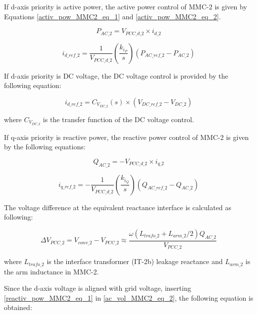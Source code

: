 If d-axis priority is active power, the active power control of \gls{MMC}-2 is given by Equations \ref{activ_pow_MMC2_eq_1} and \ref{activ_pow_MMC2_eq_2}.

\begin{equation}\label{activ_pow_MMC2_eq_1}
    P_{AC\_2} = V_{PCC\_d\_2} \times i_{d\_2}
\end{equation}

\begin{equation}\label{activ_pow_MMC2_eq_2}
    i_{d\_ref\_2} =  \frac{1}{V_{PCC\_d\_2}} \left(\frac{k_{i_P}}{s}\right)\left(P_{AC\_ref\_2}-P_{AC\_2}\right)
\end{equation}

If d-axis priority is \gls{DC} voltage, the \gls{DC} voltage control is provided by the following equation:

\begin{equation}
    i_{d\_ref\_2} = C_{V_{DC\_2}}\left(s\right) \times \left(V_{DC\_ref\_2} - V_{DC\_2}\right)
\end{equation}

where $C_{V_{DC\_2}}$ is the transfer function of the \gls{DC} voltage control.

If q-axis priority is reactive power, the reactive power control of \gls{MMC}-2 is given by the following equations:

\begin{equation}\label{reactiv_pow_MMC2_eq_1}
    Q_{AC\_2} = -V_{PCC\_d\_2} \times i_{q\_2}
\end{equation}

\begin{equation}\label{reactiv_pow_MMC2_eq_2}
    i_{q\_ref\_2} = -  \frac{1}{V_{PCC\_d\_2}} \left(\frac{k_{i_Q}}{s}\right)\left(Q_{AC\_ref\_2}-Q_{AC\_2}\right)
\end{equation}

The voltage difference at the equivalent reactance interface is calculated as following:

\begin{equation}\label{ac_vol_MMC2_eq_2}
    \Delta V_{PCC\_2} = V_{conv\_2} - V_{PCC\_2} \approx \frac{\omega(L_{trafo\_2}+L_{arm\_2}/2)Q_{AC\_2}}{V_{PCC\_2}}
\end{equation}

where $L_{trafo\_2}$ is the interface transformer (IT-2b) leakage reactance and $L_{arm\_2}$ is the arm inductance in \gls{MMC}-2.

Since the d-axis voltage is aligned with grid voltage, inserting \ref{reactiv_pow_MMC2_eq_1} in \ref{ac_vol_MMC2_eq_2}, the following equation is obtained:

